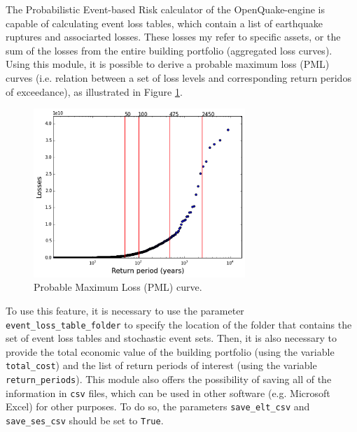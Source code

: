 The Probabilistic Event-based Risk calculator \citep{SilvaEtAl2014a} of the OpenQuake-engine is capable of calculating event loss tables, which contain a list of earthquake ruptures and associarted losses. These losses my refer to specific assets, or the sum of the losses from the entire building portfolio (aggregated loss curves). 
Using this module, it is possible to derive a probable maximum loss (PML) curves (i.e. relation between a set of loss levels and corresponding return peridos of exceedance), as illustrated in Figure \ref{fig:pml}.

\begin{figure}[htb]
  \centering
      \includegraphics[width=8cm]{figures/pml_example.png}
  \caption{Probable Maximum Loss (PML) curve.}
  \label{fig:pml}
\end{figure}

To use this feature, it is necessary to use the parameter \verb=event_loss_table_folder= to specify the location of the folder that contains the set of event loss tables and stochastic event sets. Then, it is also necessary to provide the total economic value of the building portfolio (using the variable \verb=total_cost=) and the list of return periods of interest (using the variable \verb=return_periods=). This module also offers the possibility of saving all of the information in \verb=csv= files, which can be used in other software (e.g. Microsoft Excel) for other purposes. To do so, the parameters \verb=save_elt_csv= and \verb=save_ses_csv= should be set to \verb=True=.